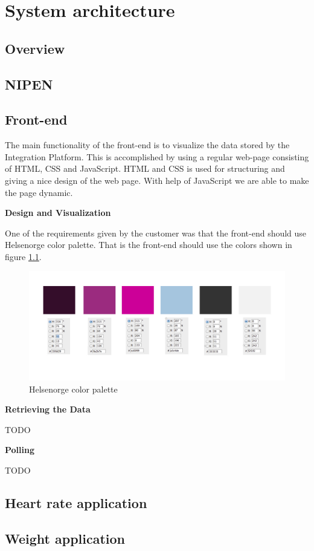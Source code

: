 \chapter{System architecture}
\label{ch:architecture}


\section{Overview}
\section{NIPEN}

\section{Front-end}

The main functionality of the front-end is to visualize the data stored by the Integration Platform.
This is accomplished by using a regular web-page consisting of HTML, CSS and JavaScript. HTML and CSS is used for structuring and giving a nice design of the web page. With help of JavaScript we are able to make the page dynamic.

\textbf{Design and Visualization}

One of the requirements given by the customer was that the front-end should use Helsenorge color palette. That is the front-end should use the colors shown in figure \ref{figure:helsenorge-color-palette}.

\begin{figure}[h]
\centering
\includegraphics[scale=0.30]{../Figures/helsenorge_pallett.jpg}
\caption{Helsenorge color palette}
\label{figure:helsenorge-color-palette}
\end{figure}

\textbf{Retrieving the Data}

TODO

\textbf{Polling}

TODO

\section{Heart rate application}
\section{Weight application}
